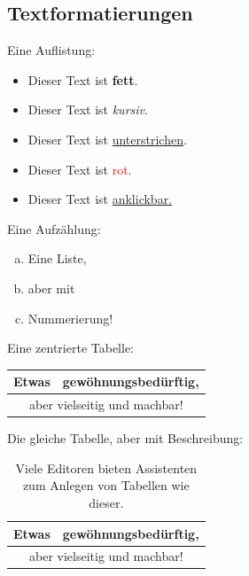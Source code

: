 \subsection*{Textformatierungen}
Eine Auflistung:
\begin{itemize}
  \item Dieser Text ist \textbf{fett}.
  \item Dieser Text ist \textit{kursiv}.
  \item Dieser Text ist \underline{unterstrichen}.
  \item Dieser Text ist \textcolor{red}{rot}.
  \item Dieser Text ist \href{https://gitlab.com/phist91/latex-templates}{anklickbar.}
\end{itemize}

Eine Aufzählung:
\begin{enumerate}[(a)]
  \item Eine Liste,
  \item aber mit
  \item Nummerierung!
\end{enumerate}

Eine zentrierte Tabelle:
\begin{center}
  \begin{tabular}{|c|c|} \hline
         Etwas         &  gewöhnungsbedürftig,         \\ \hline
    \multicolumn{2}{|c|}{aber vielseitig und machbar!} \\ \hline
  \end{tabular}
\end{center}

Die gleiche Tabelle, aber mit Beschreibung:
\begin{table}[h]
  \begin{center}
    \begin{tabular}{|c|c|} \hline
      Etwas         &  gewöhnungsbedürftig,        \\ \hline
      \multicolumn{2}{|c|}{aber vielseitig und machbar!} \\ \hline
    \end{tabular}
  \end{center}
  \caption{Viele Editoren bieten Assistenten zum Anlegen von Tabellen wie dieser.}
\end{table}


